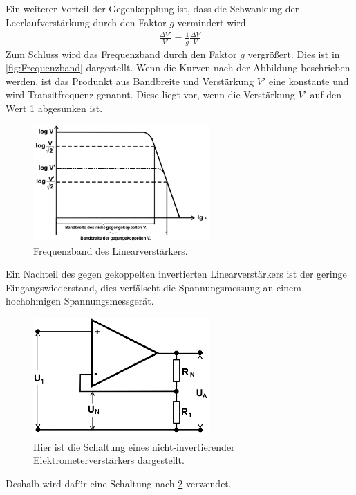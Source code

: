 Ein weiterer Vorteil der Gegenkopplung ist, dass die Schwankung der Leerlaufverstärkung durch den Faktor $g$ vermindert wird.
\begin{align}
	\frac{\Delta V'}{V'}=\frac{1}{g}\frac{\Delta V}{V}
\end{align}
Zum Schluss wird das Frequenzband durch den Faktor $g$ vergrößert.
Dies ist in \cref{fig:Frequenzband} dargestellt. Wenn die Kurven nach der Abbildung beschrieben werden, ist das Produnkt aus Bandbreite und Verstärkung $V'$ eine  konstante und wird Transitfrequenz genannt.
Diese liegt vor, wenn die Verstärkung $V'$ auf den Wert 1 abgesunken ist.
\begin{figure}
	\centering
	\includegraphics[width = 0.6\textwidth]{../Grafiken/Frequenz_Liniearverstaerker.png}
	\caption{Frequenzband des Linearverstärkers. \cite{V51}\label{fig:Frequenzgang}}
\end{figure}
Ein Nachteil des gegen gekoppelten invertierten Linearverstärkers ist der geringe Eingangswiederstand, dies verfälscht die Spannungsmessung an einem hochohmigen Spannungsmessgerät.
\begin{figure}[h!]
	\centering
	\includegraphics[width = 0.6\textwidth]{../Grafiken/nicht_invertierter_Linearverstaerker.png}
	\caption{Hier ist die Schaltung eines nicht-invertierender Elektrometerverstärkers dargestellt. \cite{V51}\label{fig:Elektrometerverstärker}}
\end{figure}
Deshalb wird dafür eine Schaltung nach \cref{fig:Elektrometerverstärker} verwendet.

